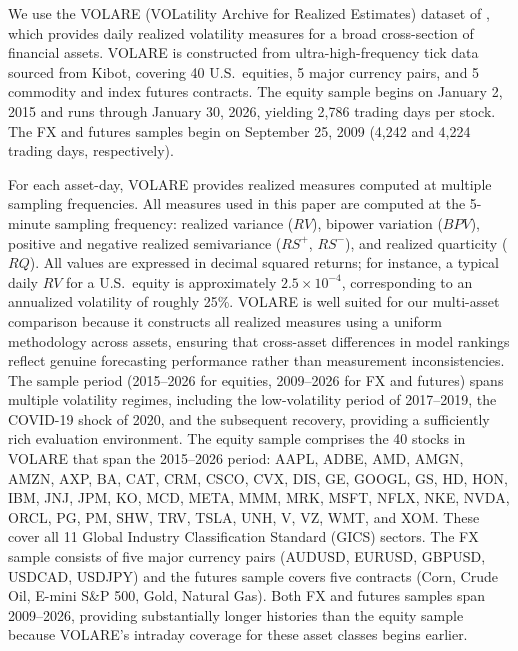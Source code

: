 \documentclass[12pt]{article}
\begin{document}
We use the VOLARE (VOLatility Archive for Realized Estimates) dataset of \citet{volare2026}, which provides daily realized volatility measures for a broad cross-section of financial assets. VOLARE is constructed from ultra-high-frequency tick data sourced from Kibot, covering 40 U.S.\ equities, 5 major currency pairs, and 5 commodity and index futures contracts. The equity sample begins on January 2, 2015 and runs through January 30, 2026, yielding 2,786 trading days per stock. The FX and futures samples begin on September 25, 2009 (4,242 and 4,224 trading days, respectively).

For each asset-day, VOLARE provides realized measures computed at multiple sampling frequencies. All measures used in this paper are computed at the 5-minute sampling frequency: realized variance ($RV$), bipower variation ($BPV$), positive and negative realized semivariance ($RS^{+}$, $RS^{-}$), and realized quarticity ($RQ$). All values are expressed in decimal squared returns; for instance, a typical daily $RV$ for a U.S.\ equity is approximately $2.5 \times 10^{-4}$, corresponding to an annualized volatility of roughly 25\%. VOLARE is well suited for our multi-asset comparison because it constructs all realized measures using a uniform methodology across assets, ensuring that cross-asset differences in model rankings reflect genuine forecasting performance rather than measurement inconsistencies. The sample period (2015--2026 for equities, 2009--2026 for FX and futures) spans multiple volatility regimes, including the low-volatility period of 2017--2019, the COVID-19 shock of 2020, and the subsequent recovery, providing a sufficiently rich evaluation environment.
The equity sample comprises the 40 stocks in VOLARE that span the 2015--2026 period: AAPL, ADBE, AMD, AMGN, AMZN, AXP, BA, CAT, CRM, CSCO, CVX, DIS, GE, GOOGL, GS, HD, HON, IBM, JNJ, JPM, KO, MCD, META, MMM, MRK, MSFT, NFLX, NKE, NVDA, ORCL, PG, PM, SHW, TRV, TSLA, UNH, V, VZ, WMT, and XOM. These cover all 11 Global Industry Classification Standard (GICS) sectors. The FX sample consists of five major currency pairs (AUDUSD, EURUSD, GBPUSD, USDCAD, USDJPY) and the futures sample covers five contracts (Corn, Crude Oil, E-mini S\&P 500, Gold, Natural Gas). Both FX and futures samples span 2009--2026, providing substantially longer histories than the equity sample because VOLARE's intraday coverage for these asset classes begins earlier.
\end{document}
